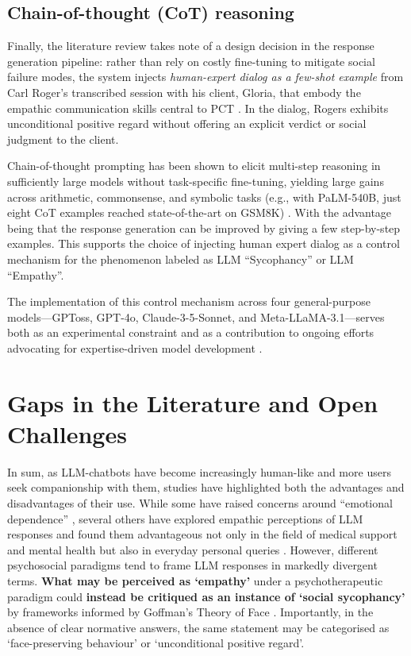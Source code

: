 \subsection{Chain-of-thought (CoT) reasoning}
Finally, the literature review takes note of a design decision in the response generation pipeline: rather than rely on costly fine-tuning to mitigate social failure modes, the system injects \emph{human-expert dialog as a few-shot example} from Carl Roger’s transcribed session with his client, Gloria, that embody the empathic communication skills central to PCT \cite{rogersgloria}. In the dialog, Rogers exhibits unconditional positive regard without offering an explicit verdict or social judgment to the client. 

\medskip Chain-of-thought prompting has been shown to elicit multi-step reasoning in sufficiently large models without task-specific fine-tuning, yielding large gains across arithmetic, commonsense, and symbolic tasks (e.g., with PaLM-540B, just eight CoT examples reached state-of-the-art on GSM8K) \cite{cot}. With the advantage being that the response generation can be improved by giving a few step-by-step examples. This supports the choice of injecting human expert dialog as a control mechanism for the phenomenon labeled as LLM “Sycophancy” or LLM “Empathy”.

\medskip The implementation of this control mechanism across four general-purpose models—GPToss, GPT-4o, Claude-3-5-Sonnet, and Meta-LLaMA-3.1—serves both as an experimental constraint and as a contribution to ongoing efforts advocating for expertise-driven model development \cite{dredze}.

\newpage
\section{Gaps in the Literature and Open Challenges}\label{sec:gaps}
In sum, as LLM-chatbots have become increasingly human-like and more users seek companionship with them, studies have highlighted both the advantages and disadvantages of their use. While some have raised concerns around “emotional dependence” \cite{fang-etal-psychoeffects}, several others have explored empathic perceptions of LLM responses and found them advantageous not only in the field of medical support and mental health but also in everyday personal queries \cite{Lee-etal-Empathic, sorin-etal-empathy}.
However, different psychosocial paradigms tend to frame LLM responses in markedly divergent terms. \textbf{What may be perceived as ‘empathy’} under a psychotherapeutic paradigm could \textbf{instead be critiqued as an instance of ‘social sycophancy’} by frameworks informed by Goffman's Theory of Face \cite{cheng-etal-sycophancy}.
Importantly, in the absence of clear normative answers, the same statement may be categorised as ‘face-preserving behaviour’ or ‘unconditional positive regard’. 


